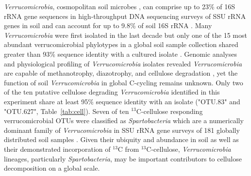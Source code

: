 \textit{Verrucomicrobia}, cosmopolitan soil microbes
\citep{Bergmann_2011}, can comprise up to 23\% of 16S rRNA gene sequences in
high-throughput DNA sequencing surveys of SSU rRNA genes in soil
\citep{Bergmann_2011} and can account for up to 9.8\% of
soil 16S rRNA \citep{Buckley_2001}. Many \textit{Verrucomicrobia} were first
isolated in the last decade \cite{Wertz_2011} but only one of the 15 most
abundant verrucomicrobial phylotypes in a global soil sample collection shared
greater than 93\% sequence identity with a cultured isolate
\citep{Bergmann_2011}. Genomic analyses and physiological profiling of
\textit{Verrucomicrobia} isolates revealed \textit{Verrucomicrobia} are capable
of methanotrophy, diazotrophy, and cellulose degradation \citep{Otsuka_2012,
Wertz_2011}, yet the function of soil \textit{Verrucomicrobia} in global C-cycling
remains unknown. Only two of the ten putative cellulose degrading
\textit{Verrucomicrobia} identified in this experiment share at least 95\%
sequence identity with an isolate ("OTU.83" and "OTU.627",
Table~\ref{tab:cell}). Seven of ten $^{13}$C-cellulose responding
verrucomicrobial OTUs were classified as \textit{Spartobacteria} which are
a numerically dominant family of \textit{Verrucomicrobia} in SSU rRNA gene
surveys of 181 globally distributed soil samples \citep{Bergmann_2011}. Given
their ubiquity and abundance in soil as well as their demonstrated
incorporation of $^{13}$C from $^{13}$C-cellulose, \textit{Verrucomicrobia}
lineages, particularly \textit{Spartobacteria}, may be important contributors
to cellulose decomposition on a global scale.

